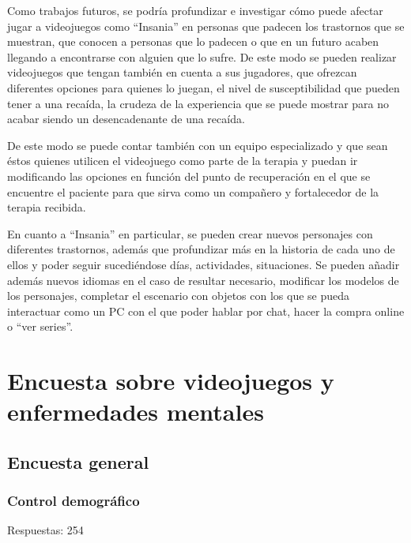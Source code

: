 \documentclass[12pt, a4paper,twoside,titlepage]{book}
\let\origdoublepage\cleardoublepage
\renewcommand{\cleardoublepage}{\clearpage{\pagestyle{empty}\origdoublepage}}
\begin{document}
Como trabajos futuros, se podría profundizar e investigar cómo puede afectar jugar a videojuegos como ``Insania'' en personas que padecen los trastornos que se muestran, que conocen a personas que lo padecen o que en un futuro acaben llegando a encontrarse con alguien que lo sufre. De este modo se pueden realizar videojuegos que tengan también en cuenta a sus jugadores, que ofrezcan diferentes opciones para quienes lo juegan, el nivel de susceptibilidad que pueden tener a una recaída, la crudeza de la experiencia que se puede mostrar para no acabar siendo un desencadenante de una recaída. 

De este modo se puede contar también con un equipo especializado y que sean éstos quienes utilicen el videojuego como parte de la terapia y puedan ir modificando las opciones en función del punto de recuperación en el que se encuentre el paciente para que sirva como un compañero y fortalecedor de la terapia recibida. 

En cuanto a ``Insania'' en particular, se pueden crear nuevos personajes con diferentes trastornos, además que profundizar más en la historia de cada uno de ellos y poder seguir sucediéndose días, actividades, situaciones. Se pueden añadir además nuevos idiomas en el caso de resultar necesario, modificar los modelos de los personajes, completar el escenario con objetos con los que se pueda interactuar como un PC con el que poder hablar por chat, hacer la compra online o ``ver series''.   



\cleardoublepage
{}
{}


\printbibliography
% 
%
%



\cleardoublepage
\appendix


\chapter{Encuesta sobre videojuegos y enfermedades mentales}
\label{sec:anexo}
\section{Encuesta general}

\subsection{Control demográfico}
Respuestas: 254
\end{document}
